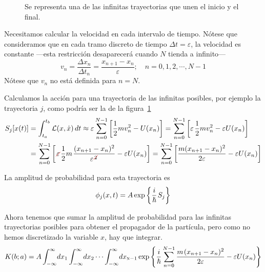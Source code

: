\begin{figure}[ht]
\begin{minipage}{0.99\linewidth}
\end{minipage}
\caption{Se representa una de las infinitas trayectorias que unen el
  inicio y el final.}
\label{fig:path_integral_trajectory}
\end{figure}

Necesitamos calcular la velocidad en cada intervalo de
tiempo. Nótese que consideramos que en cada tramo discreto de tiempo
$\Delta t = \varepsilon$, la velocidad es constante ---esta
restricción desaparecerá cuando $N$ tienda a infinito---
\[
  v_n = \dfrac{\Delta x_n}{\Delta t_n} = \dfrac{x_{n+1}-x_n}{\varepsilon}
  ;\hspace{1em}
  n = 0, 1, 2, \cdots, N-1
\]
Nótese que $v_n$ no está definida para $n=N$.

Calculamos la acción para una trayectoria de las infinitas posibles,
por ejemplo la trayectoria $j$, como podría ser la de la
figura~\ref{fig:path_integral_trajectory}
\begin{align*}
  S_j[x(t)]
  &=
    \int_{t_a}^{t_b} \mathcal{L}(x,\dot{x})\,dt
    \approx
    \varepsilon\sum_{n=0}^{N-1} \left[\dfrac{1}{2}mv_n^2-U(x_n)\right]
    =
    \sum_{n=0}^{N-1} \left[\varepsilon\kern1.2pt\dfrac{1}{2}mv_n^2-\varepsilon U(x_n)\right]\\
  &=
    \sum_{n=0}^{N-1}\left[
    \cancelout{\varepsilon}\dfrac{1}{2}m\kern1pt\dfrac{(x_{n+1}-x_n)^2}{\varepsilon^{\cancelout{\scriptstyle 2}}}-\varepsilon U(x_n)
    \right]
  =
    \sum_{n=0}^{N-1}\left[
    \dfrac{m(x_{n+1}-x_n)^2}{2\varepsilon}-\varepsilon U(x_n)
    \right]
\end{align*}

La amplitud de probabilidad para esta trayectoria es
\[
  \phi_j (x,t) = A \exp\left\{\dfrac{i}{\hslash}\kern1pt S_j\right\}
\]

Ahora tenemos que sumar la amplitud de probabilidad para las infinitas
trayectorias posibles para obtener el propagador de la partícula, pero
como no hemos discretizado la variable $x$, hay que integrar.
{\small
\begin{equation}\label{eq:propagador_feynman}
  K(b;a)
  = A \int_{-\infty}^{\infty} \! dx_1
  \int_{-\infty}^{\infty} \! dx_2
  \cdots
  \int_{-\infty}^{\infty} \! dx_{\textsc{n}-1}
  \exp\left\{
  \dfrac{i}{\hslash}\sum_{n=0}^{N-1}\dfrac{m\kern1pt(x_{n+1}-x_n)^2}{2\varepsilon} - \varepsilon U(x_n)
  \right\}
\end{equation}
}

